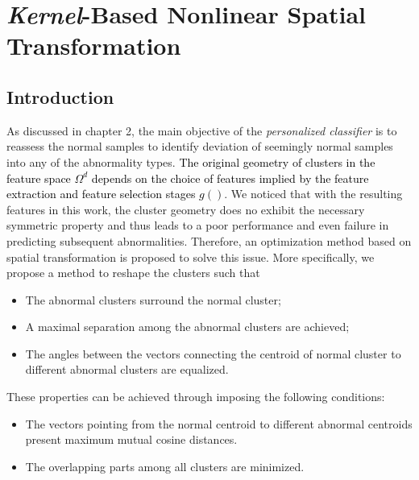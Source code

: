 \chapter{\textit{Kernel}-Based Nonlinear Spatial Transformation}\label{ch:spheremapping}
\section{Introduction}\label{sec:intro-kernel}

As discussed in chapter 2, the main objective of the \textit{personalized classifier} is to reassess the normal samples to identify deviation of seemingly normal samples into any of the abnormality types. \textcolor{black}{The original geometry of clusters in the feature space $\Omega^d$ depends on the choice of features implied by the feature extraction and feature selection stages $g()$}. We noticed that with the resulting features in this work, the cluster geometry does no exhibit the necessary symmetric property and thus leads to a poor performance and even failure in predicting subsequent abnormalities. 
Therefore, an optimization method based on spatial transformation is proposed to solve this issue. More specifically, we propose a method to reshape the clusters such that 
\begin{itemize}
\item The abnormal clusters surround the normal cluster; 
\item A maximal separation among the abnormal clusters are achieved; 
\item The angles between the vectors connecting the centroid of normal cluster to different abnormal clusters are equalized. 
\end{itemize}

These properties can be achieved through imposing the following conditions:  
 \begin{itemize}
     \item The vectors pointing from the normal centroid to different abnormal centroids present maximum mutual cosine distances.
     \item The overlapping parts among all clusters are minimized.
 \end{itemize}



